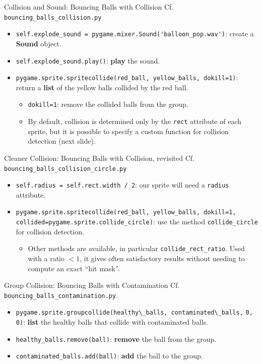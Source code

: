 \documentclass[aspectratio=169]{beamer}
\renewcommand{\emph}[1]{\textcolor{ClearTitle}{\bf #1}}
\begin{document}
\begin{frame}[fragile]{Collision and Sound: Bouncing Balls with Collision}
Cf. \verb|bouncing_balls_collision.py|
\begin{itemize}
\item \verb|self.explode_sound = pygame.mixer.Sound('balloon_pop.wav')|: create a \emph{Sound} object.
\item \verb|self.explode_sound.play()|: \emph{play} the sound.
\item \verb|pygame.sprite.spritecollide(red_ball, yellow_balls, dokill=1)|: return a \emph{list} of the yellow balls collided by the red ball.
\begin{itemize}
\item \verb|dokill=1|: remove the collided balls from the group.
\item By default, collision is determined only by the \verb|rect| attribute of each sprite, but it is possible to specify a custom function for collision detection (next slide).
\end{itemize}
\end{itemize}
\end{frame}

\begin{frame}[fragile]{Cleaner Collision: Bouncing Balls with Collision, revisited}
Cf. \verb|bouncing_balls_collision_circle.py|
\begin{itemize}
\item \verb|self.radius = self.rect.width / 2|: our sprite will need a \verb|radius| attribute.
\item \verb|pygame.sprite.spritecollide(red_ball, yellow_balls, dokill=1,| \verb|collided=pygame.sprite.collide_circle)|: use the method \verb|collide_circle| for collision detection.
\begin{itemize}
\item Other methods are available, in particular \verb|collide_rect_ratio|. Used with a ratio $< 1$, it gives often satisfactory results without needing to compute an exact ``hit mask''.
\end{itemize}
\end{itemize}
\end{frame}

\begin{frame}[fragile]{Group Collision: Bouncing Balls with Contamination}
Cf. \verb|bouncing_balls_contamination.py|.
\begin{itemize}
\item \verb|pygame.sprite.groupcollide(healthy\_balls, contaminated\_balls,| \verb|0, 0)|: \emph{list} the healthy balls that collide with contaminated balls.
\item \verb|healthy_balls.remove(ball)|: \emph{remove} the ball from the group.
\item \verb|contaminated_balls.add(ball)|: \emph{add} the ball to the group.
\end{itemize}
\end{frame}
\end{document}
